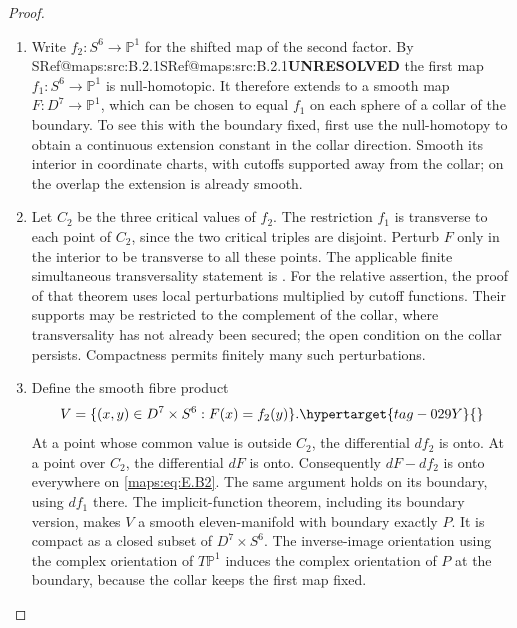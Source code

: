 \documentclass[11pt,a4paper]{article}
\makeatletter
\numberwithin{equation}{section}
\theoremstyle{definition}
\newcommand{\SeriesRefText}[1]{\ifcsname SRef@#1\endcsname\csname SRef@#1\endcsname\else\textbf{UNRESOLVED}\fi}
\newcommand{\SeriesRef}[1]{\ifmmode\text{\SeriesRefText{#1}}\else\SeriesRefText{#1}\fi}
\makeatother
\begin{document}
\begin{proof}
\begin{enumerate}[label=\arabic*.,leftmargin=*]
\item Write $f_2:S^6\to\mathbb P^1$ for the shifted map of the second
factor. By \SeriesRef{maps:src:B.2.1} the first map $f_1:S^6\to\mathbb P^1$ is
null-homotopic. It therefore extends to a smooth map
$F:D^7\to\mathbb P^1$, which can be chosen to equal $f_1$ on
each sphere of a collar of the boundary. To see this with the
boundary fixed, first use the null-homotopy to obtain a continuous
extension constant in the collar direction. Smooth its interior
in coordinate charts, with cutoffs supported away from the collar;
on the overlap the extension is already smooth.

\item Let $C_2$ be the three critical values of $f_2$. The restriction
$f_1$ is transverse to each point of $C_2$, since the two critical
triples are disjoint. Perturb $F$ only in the interior to be
transverse to all these points. The applicable finite simultaneous
transversality statement is
\cite[Chapter~3, \S2, Theorem~2.1, p.~74; Theorem~2.5, p.~78; cutoff globalization, pp.~75--76]{rootHirsch76}.
For the relative assertion, the proof of that theorem uses local
perturbations multiplied by cutoff functions. Their supports may
be restricted to the complement of the collar, where
transversality has not already been secured; the open condition
on the collar persists. Compactness permits finitely many such
perturbations. 

\item Define the smooth fibre product
\begin{equation}
 V=\{(x,y)\in D^7\times S^6:F(x)=f_2(y)\}.
 \hypertarget{tag-029Y}{}\label{maps:eq:E.B2}
\end{equation}
At a point whose common value is outside $C_2$, the differential
$df_2$ is onto. At a point over $C_2$, the differential $dF$ is
onto. Consequently $dF-df_2$ is onto everywhere on \eqref{maps:eq:E.B2}.
The same argument holds on its boundary, using $df_1$ there.
The implicit-function theorem, including its boundary version,
makes $V$ a smooth eleven-manifold with boundary exactly $P$.
It is compact as a closed subset of $D^7\times S^6$.
The inverse-image orientation using the complex orientation of
$T\mathbb P^1$ induces the complex orientation of $P$ at the
boundary, because the collar keeps the first map fixed.


\end{enumerate}
\end{proof}
\end{document}
